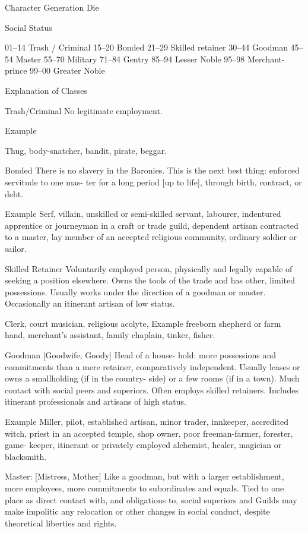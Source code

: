 \begin{Chapter}{Character Generation}
Die  

Social Status 

01–14   Trash / Criminal 
15–20   Bonded 
21–29   Skilled retainer 
30–44   Goodman 
45–54   Master 
55–70   Military 
71–84   Gentry 
85–94   Lesser Noble 
95–98   Merchant-prince 
99–00   Greater Noble 

Explanation of Classes 

Trash/Criminal No legitimate employment. 

Example 

Thug, body-snatcher, bandit, pirate, beggar. 

Bonded There is no slavery in the Baronies. This is 
the next best thing: enforced servitude to one mas-
ter  for  a  long  period  [up  to  life],  through  birth, 
contract, or debt. 

Example 
Serf,  villain,  unskilled  or  semi-skilled 
servant,  labourer,  indentured  apprentice  or  journeyman  in 
a  craft  or  trade  guild,  dependent  artisan  contracted  to  a 
master,  lay  member  of  an  accepted  religious  community, 
ordinary soldier or sailor. 

Skilled  Retainer  Voluntarily  employed  person, 
physically and legally capable of seeking a position 
elsewhere.  Owns  the  tools  of  the  trade  and  has 
other, limited possessions. Usually works under the 
direction of a goodman or master. Occasionally an 
itinerant artisan of low status. 

Clerk,  court  musician,  religious  acolyte, 
Example 
freeborn  shepherd  or  farm  hand,  merchant’s  assistant, 
family chaplain, tinker, fisher. 

Goodman  [Goodwife,  Goody]  Head  of  a  house-
hold:  more  possessions  and  commitments  than  a 
mere  retainer,  comparatively  independent.  Usually 
leases  or  owns  a  smallholding  (if  in  the  country-
side)  or  a  few  rooms  (if  in  a  town).  Much contact 
with  social  peers  and  superiors.  Often  employs 
skilled  retainers.  Includes  itinerant  professionals 
and artisans of high status. 

Example 
Miller,  pilot,  established  artisan,  minor 
trader,  innkeeper,  accredited  witch,  priest  in  an  accepted 
temple, shop owner, poor freeman-farmer, forester, game-
keeper,  itinerant  or  privately  employed  alchemist,  healer, 
magician or blacksmith. 

Master: [Mistress, Mother] Like a  goodman, but 
with a larger establishment, more employees, more 
commitments  to  subordinates  and  equals.  Tied  to 
one place as direct contact with, and obligations to, 
social  superiors  and  Guilds  may  make  impolitic 
any  relocation  or  other  changes  in  social  conduct, 
despite theoretical liberties and rights. 


\end{Chapter}
